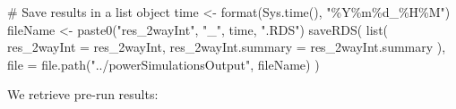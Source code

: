 \documentclass[
  letterpaper,
  DIV=11,
  numbers=noendperiod]{scrartcl}
\newenvironment{Shaded}{\begin{snugshade}}{\end{snugshade}}
\newcommand{\AttributeTok}[1]{\textcolor[rgb]{0.40,0.45,0.13}{#1}}
\newcommand{\CommentTok}[1]{\textcolor[rgb]{0.37,0.37,0.37}{#1}}
\newcommand{\FunctionTok}[1]{\textcolor[rgb]{0.28,0.35,0.67}{#1}}
\newcommand{\NormalTok}[1]{\textcolor[rgb]{0.00,0.23,0.31}{#1}}
\newcommand{\OtherTok}[1]{\textcolor[rgb]{0.00,0.23,0.31}{#1}}
\newcommand{\StringTok}[1]{\textcolor[rgb]{0.13,0.47,0.30}{#1}}
\begin{document}
\begin{Shaded}
\begin{Highlighting}[]
\CommentTok{\# Save results in a list object}
\NormalTok{time }\OtherTok{\textless{}{-}} \FunctionTok{format}\NormalTok{(}\FunctionTok{Sys.time}\NormalTok{(), }\StringTok{"\%Y\%m\%d\_\%H\%M"}\NormalTok{)}
\NormalTok{fileName }\OtherTok{\textless{}{-}} \FunctionTok{paste0}\NormalTok{(}\StringTok{"res\_2wayInt"}\NormalTok{, }\StringTok{"\_"}\NormalTok{, time, }\StringTok{".RDS"}\NormalTok{)}
\FunctionTok{saveRDS}\NormalTok{(}
  \FunctionTok{list}\NormalTok{(}
    \AttributeTok{res\_2wayInt =}\NormalTok{ res\_2wayInt,}
    \AttributeTok{res\_2wayInt.summary =}\NormalTok{ res\_2wayInt.summary}
\NormalTok{  ),}
  \AttributeTok{file =} \FunctionTok{file.path}\NormalTok{(}\StringTok{"../powerSimulationsOutput"}\NormalTok{, fileName)}
\NormalTok{)}
\end{Highlighting}
\end{Shaded}

We retrieve pre-run results:
\end{document}
